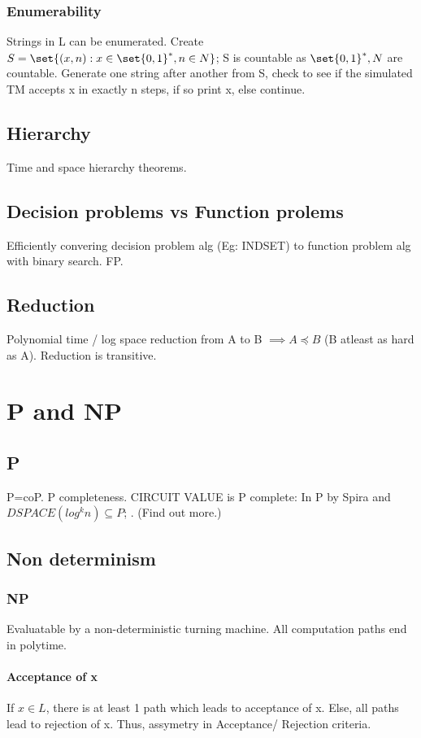 \documentclass[oneside, article]{memoir}
\begin{document}
\subsection{Enumerability}
Strings in L can be enumerated. Create $S = \set{(x, n): x \in \set{0,1}^{*}, n \in N}$; S is countable as $\set{0,1}^{*}, N$ are countable. Generate one string after another from S, check to see if the simulated TM accepts x in exactly n steps, if so print x, else continue.

\section{Hierarchy}
Time and space hierarchy theorems. \tbc

\section{Decision problems vs Function prolems}
Efficiently convering decision problem alg (Eg: INDSET) to function problem alg with binary search. FP.

\section{Reduction}
Polynomial time / log space reduction from A to B $\implies A \preceq B$ (B atleast as hard as A). Reduction is transitive.

\chapter{P and NP}
\section{P}
P=coP. P completeness. CIRCUIT VALUE is P complete: In P by Spira and $DSPACE(log^{k} n) \subseteq P$; . (Find out more.)

\section{Non determinism}
\subsection{NP}
Evaluatable by a non-deterministic turning machine. All computation paths end in polytime.

\subsubsection{Acceptance of x}
If $x \in L$, there is at least 1 path which leads to acceptance of x. Else, all paths lead to rejection of x. Thus, assymetry in Acceptance/ Rejection criteria.
\end{document}
